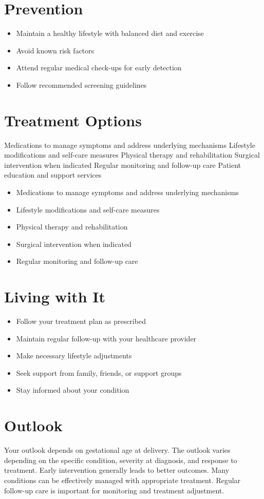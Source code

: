 \section{Prevention}
\begin{itemize}[noitemsep]
  \item Maintain a healthy lifestyle with balanced diet and exercise
  \item Avoid known risk factors
  \item Attend regular medical check-ups for early detection
  \item Follow recommended screening guidelines
\end{itemize}
\section{Treatment Options}
Medications to manage symptoms and address underlying mechanisms Lifestyle modifications and self-care measures Physical therapy and rehabilitation Surgical intervention when indicated Regular monitoring and follow-up care Patient education and support services

\begin{itemize}[noitemsep]
  \item Medications to manage symptoms and address underlying mechanisms
  \item Lifestyle modifications and self-care measures
  \item Physical therapy and rehabilitation
  \item Surgical intervention when indicated
  \item Regular monitoring and follow-up care
\end{itemize}
\section{Living with It}
\begin{itemize}[noitemsep]
  \item Follow your treatment plan as prescribed
  \item Maintain regular follow-up with your healthcare provider
  \item Make necessary lifestyle adjustments
  \item Seek support from family, friends, or support groups
  \item Stay informed about your condition
\end{itemize}
\section{Outlook}
Your outlook depends on gestational age at delivery. The outlook varies depending on the specific condition, severity at diagnosis, and response to treatment. Early intervention generally leads to better outcomes. Many conditions can be effectively managed with appropriate treatment. Regular follow-up care is important for monitoring and treatment adjustment.

